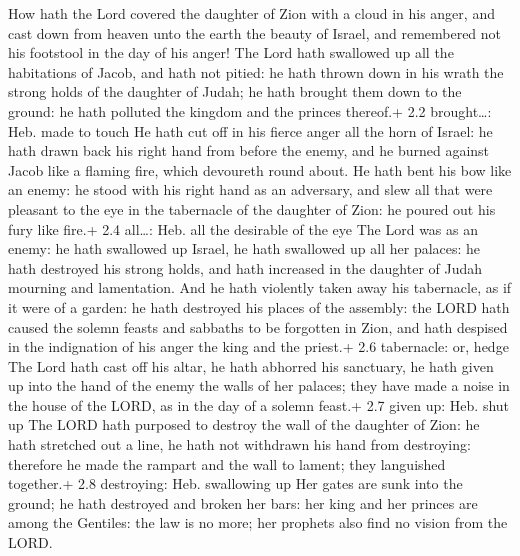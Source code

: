  How hath the Lord covered the daughter of Zion with a cloud
in his anger, and cast down from heaven unto the earth the beauty of
Israel, and remembered not his footstool in the day of his anger!
 The Lord hath swallowed up all the habitations of Jacob,
and hath not pitied: he hath thrown down in his wrath the strong holds
of the daughter of Judah; he hath brought them down to the ground: he
hath polluted the kingdom and the princes thereof.+ 2.2 brought\ldots:
Heb. made to touch  He hath cut off in his fierce anger all
the horn of Israel: he hath drawn back his right hand from before the
enemy, and he burned against Jacob like a flaming fire, which devoureth
round about.  He hath bent his bow like an enemy: he stood
with his right hand as an adversary, and slew all that were pleasant to
the eye in the tabernacle of the daughter of Zion: he poured out his
fury like fire.+ 2.4 all\ldots: Heb. all the desirable of the eye
 The Lord was as an enemy: he hath swallowed up Israel, he
hath swallowed up all her palaces: he hath destroyed his strong holds,
and hath increased in the daughter of Judah mourning and lamentation.
 And he hath violently taken away his tabernacle, as if it
were of a garden: he hath destroyed his places of the assembly: the LORD
hath caused the solemn feasts and sabbaths to be forgotten in Zion, and
hath despised in the indignation of his anger the king and the priest.+
2.6 tabernacle: or, hedge  The Lord hath cast off his altar,
he hath abhorred his sanctuary, he hath given up into the hand of the
enemy the walls of her palaces; they have made a noise in the house of
the LORD, as in the day of a solemn feast.+ 2.7 given up: Heb. shut up
 The LORD hath purposed to destroy the wall of the daughter
of Zion: he hath stretched out a line, he hath not withdrawn his hand
from destroying: therefore he made the rampart and the wall to lament;
they languished together.+ 2.8 destroying: Heb. swallowing up
 Her gates are sunk into the ground; he hath destroyed and
broken her bars: her king and her princes are among the Gentiles: the
law is no more; her prophets also find no vision from the LORD.


